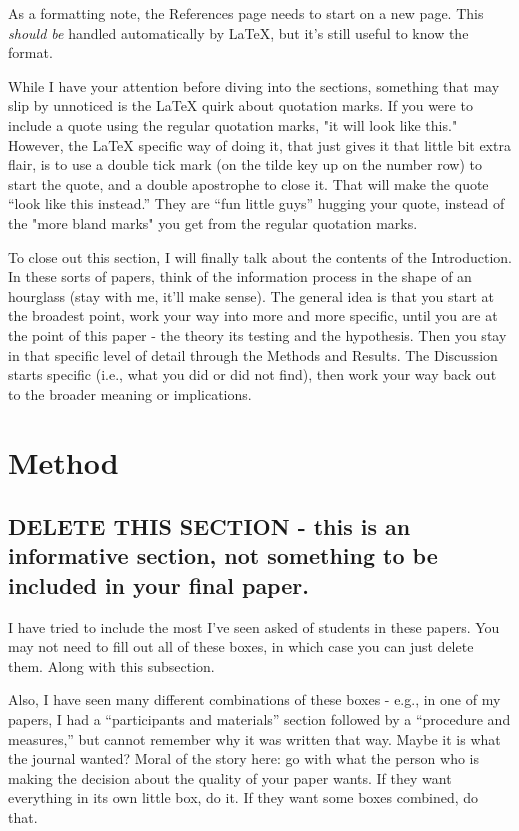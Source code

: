 \documentclass[stu,12pt,floatsintext,justification]{apa7_ula}
\begin{document}
As a formatting note, the References page needs to start on a new page. This
\textit{should be} handled automatically by \LaTeX{}, but it's still useful to
know the format.

While I have your attention before diving into the sections, something that may
slip by unnoticed is the \LaTeX{} quirk about quotation marks. If you were to
include a quote using the regular quotation marks, "it will look like this."
However, the \LaTeX{} specific way of doing it, that just gives it that little
bit extra flair, is to use a double tick mark (on the tilde key up on the
number row) to start the quote, and a double apostrophe to close it. That will
make the quote ``look like this instead.'' They are ``fun little guys'' hugging
your quote, instead of the "more bland marks" you get from the regular
quotation marks.

To close out this section, I will finally talk about the contents of the
Introduction. In these sorts of papers, think of the information process in the
shape of an hourglass (stay with me, it'll make sense). The general idea is
that you start at the broadest point, work your way into more and more
specific, until you are at the point of this paper - the theory its testing and
the hypothesis. Then you stay in that specific level of detail through the
Methods and Results. The Discussion starts specific (i.e., what you did or did
not find), then work your way back out to the broader meaning or implications.

\section{Method}

\subsection{DELETE THIS SECTION - this is an informative section, not something
    to be included in your final paper.}

I have tried to include the most I've seen asked of students in these papers.
You may not need to fill out all of these boxes, in which case you can just
delete them. Along with this subsection.

Also, I have seen many different combinations of these boxes - e.g., in one of
my papers, I had a ``participants and materials'' section followed by a
``procedure and measures,'' but cannot remember why it was written that way.
Maybe it is what the journal wanted? Moral of the story here: go with what the
person who is making the decision about the quality of your paper wants. If
they want everything in its own little box, do it. If they want some boxes
combined, do that.
\end{document}

